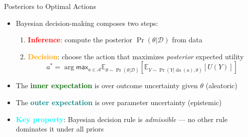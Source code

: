 \documentclass[
  10pt,
  ignorenonframetext,
]{beamer}
\providecommand{\tightlist}{%
  \setlength{\itemsep}{0pt}\setlength{\parskip}{0pt}}
\newcommand{\EE}{\mathbb{E}}
\def\max{\textsf{max}}
\begin{document}
\begin{frame}{Posteriors to Optimal Actions}
\label{posteriors-to-optimal-actions}
\begin{itemize}
\item
  Bayesian decision-making composes two steps:

  \begin{enumerate}
  \tightlist
  \item
    \textbf{\textcolor{red}{Inference}}: compute the posterior
    \(\Pr(\theta | \mathcal{D})\) from data
  \item
    \textbf{\textcolor{orange}{Decision}}: choose the action that
    maximizes \emph{posterior} expected utility \[
    a^* = \arg\max_{a \in \mathcal{A}} \EE_{\theta \sim \Pr(\theta | \mathcal{D})}
       \left[ \EE_{Y \sim \Pr(Y | \operatorname{do}(a), \theta)}[U(Y)] \right]
    \]
  \end{enumerate}
\item
  The \textbf{\textcolor{darkgreen}{inner expectation}} is over outcome
  uncertainty given \(\theta\) (aleatoric)
\item
  The \textbf{\textcolor{teal}{outer expectation}} is over parameter
  uncertainty (epistemic)
\item
  \textbf{\textcolor{cyan}{Key property}}: Bayesian decision rule is
  \emph{admissible} --- no other rule dominates it under all priors
\end{itemize}
\end{frame}
\end{document}
